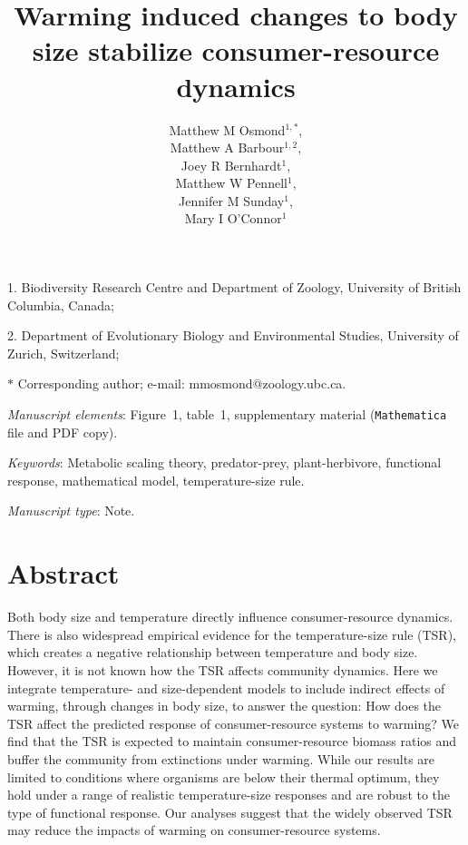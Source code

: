 \documentclass[11pt]{article}
\title{Warming induced changes to body size stabilize consumer-resource dynamics}
\author{
Matthew M Osmond$^{1,\ast}$, \\ 
Matthew A Barbour$^{1,2}$, \\
Joey R Bernhardt$^{1}$, \\
Matthew W Pennell$^{1}$, \\
Jennifer M Sunday$^{1}$, \\
Mary I O'Connor$^{1}$ 
}
\date{}
\begin{document}
\maketitle

\noindent{}1. Biodiversity Research Centre and Department of Zoology, University of British Columbia, Canada;

\noindent{}2. Department of Evolutionary Biology and Environmental Studies, University of Zurich, Switzerland;

\noindent{}$\ast$ Corresponding author; e-mail: mmosmond@zoology.ubc.ca.

\bigskip

\textit{Manuscript elements}: Figure~1, table~1, supplementary material (\texttt{Mathematica} file and PDF copy).
\bigskip

\textit{Keywords}: Metabolic scaling theory, predator-prey, plant-herbivore, functional response, mathematical model, temperature-size rule.

\bigskip

\textit{Manuscript type}: Note. 

\bigskip



\newpage{}

\section*{Abstract}
Both body size and temperature directly influence consumer-resource dynamics. There is also widespread empirical evidence for the temperature-size rule (TSR), which creates a negative relationship between temperature and body size. However, it is not known how the TSR affects community dynamics. Here we integrate temperature- and size-dependent models to include indirect effects of warming, through changes in body size, to answer the question: How does the TSR affect the predicted response of consumer-resource systems to warming? We find that the TSR is expected to maintain consumer-resource biomass ratios and buffer the community from extinctions under warming. While our results are limited to conditions where organisms are below their thermal optimum, they hold under a range of realistic temperature-size responses and are robust to the type of functional response. 
Our analyses suggest that the widely observed TSR may reduce the impacts of warming on consumer-resource systems.
\end{document}

